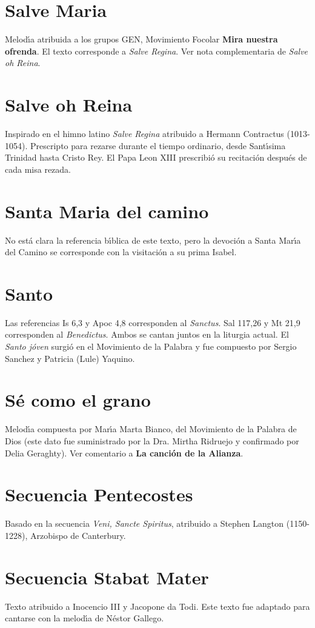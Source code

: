 \documentclass[landscape,12pt]{report}
\begin{document}
\section*{\small Salve Maria} \noindent\footnotesize Melod\'\i a atribuida a los grupos GEN, Movimiento Focolar \textbf{Mira nuestra ofrenda}. El texto corresponde a \textit{Salve Regina}. Ver nota complementaria de \textit{Salve oh Reina}.
\section*{\small Salve oh Reina} \noindent\footnotesize Inspirado en el himno latino \textit{Salve Regina} atribuido a Hermann Contractus (1013-1054). Prescripto para rezarse durante el tiempo ordinario, desde Sant\'\i sima Trinidad hasta Cristo Rey. El Papa Leon XIII prescribi\'o su recitaci\'on despu\'es de cada misa rezada.
\section*{\small Santa Maria del camino} \noindent\footnotesize No est\'a clara la referencia b\'\i blica de este texto, pero la devoci\'on a Santa Mar\'\i a del Camino se corresponde con la visitaci\'on a su prima Isabel. 
\section*{\small Santo} \noindent\footnotesize Las referencias Is 6,3 y Apoc 4,8 corresponden al \textit{Sanctus}. Sal 117,26 y Mt 21,9 corresponden al \textit{Benedictus}. Ambos se cantan juntos en la liturgia actual. El \emph{Santo j\'oven} surgi\'o en el Movimiento de la Palabra y fue compuesto por Sergio Sanchez y Patricia (Lule) Yaquino.
\section*{\small S\'e como el grano} \noindent\footnotesize Melod\'\i a compuesta por Mar\'\i a Marta Bianco, del Movimiento de la Palabra de Dios (este dato fue suministrado por la Dra. Mirtha Ridruejo y confirmado por Delia Geraghty). Ver comentario a \textbf{La canci\'on de la Alianza}.
\section*{\small Secuencia Pentecostes} \noindent\footnotesize Basado en la secuencia \textit{Veni, Sancte Spiritus}, atribuido a Stephen Langton (1150-1228), Arzobispo de Canterbury.
\section*{\small Secuencia Stabat Mater} \noindent\footnotesize Texto atribuido a Inocencio III y Jacopone da Todi. Este texto fue adaptado para cantarse con la melod\'\i a de N\'estor Gallego.
\end{document}
